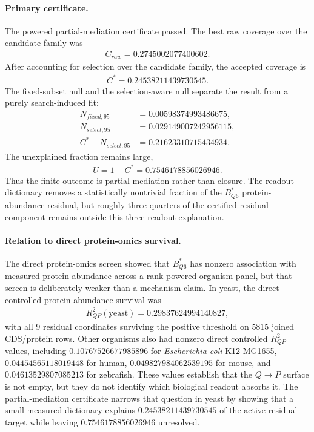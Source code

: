 \paragraph{Primary certificate.}
The powered partial-mediation certificate passed.  The best raw coverage over the candidate family was
$$
\begin{aligned}
C_{raw}=0.2745002077400602.
\end{aligned}
$$
After accounting for selection over the candidate family, the accepted coverage is
$$
\begin{aligned}
C^{\ast}=0.24538211439730545.
\end{aligned}
$$
The fixed-subset null and the selection-aware null separate the result from a purely search-induced fit:
$$
\begin{aligned}
N_{fixed,95}&=0.00598374993486675,\\
N_{select,95}&=0.029149007242956115,\\
C^{\ast}-N_{select,95}&=0.21623310715434934.
\end{aligned}
$$
The unexplained fraction remains large,
$$
\begin{aligned}
U=1-C^{\ast}=0.7546178856026946.
\end{aligned}
$$
Thus the finite outcome is partial mediation rather than closure.  The readout dictionary removes a statistically nontrivial fraction of the $B^{\ast}_{Q6}$ protein-abundance residual, but roughly three quarters of the certified residual component remains outside this three-readout explanation.

\paragraph{Relation to direct protein-omics survival.}
The direct protein-omics screen showed that $B^{\ast}_{Q6}$ has nonzero association with measured protein abundance across a rank-powered organism panel, but that screen is deliberately weaker than a mechanism claim.  In yeast, the direct controlled protein-abundance survival was
$$
\begin{aligned}
R^2_{QP}(\mathrm{yeast})=0.29837624994140827,
\end{aligned}
$$
with all $9$ residual coordinates surviving the positive threshold on $5815$ joined CDS/protein rows.  Other organisms also had nonzero direct controlled $R^2_{QP}$ values, including $0.10767526677985896$ for \emph{Escherichia coli} K12 MG1655, $0.04454565118019448$ for human, $0.049827984062539195$ for mouse, and $0.04613529807085213$ for zebrafish.  These values establish that the $Q \to P$ surface is not empty, but they do not identify which biological readout absorbs it.  The partial-mediation certificate narrows that question in yeast by showing that a small measured dictionary explains $0.24538211439730545$ of the active residual target while leaving $0.7546178856026946$ unresolved.

